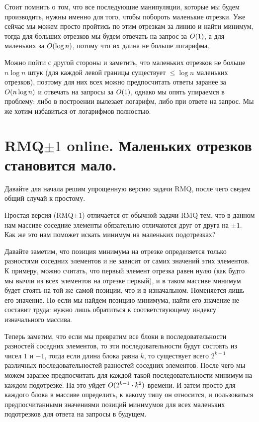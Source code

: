 Стоит помнить о том, что все последующие манипуляции, которые мы будем производить, нужны именно для того, чтобы побороть маленькие отрезки. Уже сейчас мы можем просто пройтись по этим отрезкам за линию и найти минимум, тогда для больших отрезков мы будем отвечать на запрос за $O(1)$, а для маленьких за $O(\log n)$, потому что их длина не больше логарифма.

Можно пойти с другой стороны и заметить, что маленьких отрезков не больше $n \log n$ штук (для каждой левой границы существует $\le \log n$ маленьких отрезков), поэтому для них всех можно предпосчитать ответы заранее за $O(n \log n)$ и отвечать на запросы за $O(1)$, однако мы опять упираемся в проблему: либо в построении вылезает логарифм, либо при ответе на запрос. Мы же хотим избавиться от логарифмов полностью.



\section{RMQ$\pm 1$ online. Маленьких отрезков становится мало.}

Давайте для начала решим упрощенную версию задачи RMQ, после чего сведем общий случай к простому.

Простая версия (RMQ$\pm 1$) отличается от обычной задачи RMQ тем, что в данном нам массиве соседние элементы обязательно отличаются друг от друга на $\pm 1$. Как же это нам поможет искать минимум на маленьких подотрезках?

Давайте заметим, что позиция минимума на отрезке определяется только разностями соседних элементов и не зависит от самих значений этих элементов. К примеру, можно считать, что первый элемент отрезка равен нулю (как будто мы вычли из всех элементов на отрезке первый), и в таком массиве минимум будет стоять на той же самой позиции, что и в изначальном. Поменяется лишь его значение. Но если мы найдем позицию минимума, найти его значение не составит труда: нужно лишь обратиться к соответствующему индексу изначального массива.

Теперь заметим, что если мы превратим все блоки в последовательности разностей соседних элементов, то эти последовательности будут состоять из чисел $1$ и $-1$, тогда если длина блока равна $k$, то существует всего $2^{k - 1}$ различных последовательностей разностей соседних элементов. После чего мы можем заранее предпосчитать для каждой такой последовательности минимум на каждом подотрезке. На это уйдет $O(2^{k - 1} \cdot k^2)$ времени. И затем просто для каждого блока в массиве определить, к какому типу он относится, и пользоваться предпосчитанными значениями позиций минимумов для всех маленьких подотрезков для ответа на запросы в будущем.

